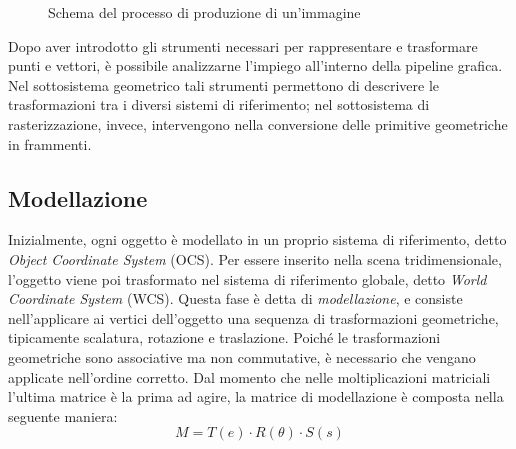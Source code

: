 \begin{figure}[ht]
    \centering
    \caption{Schema del processo di produzione di un'immagine}
    \label{fig:pipeline}
\end{figure}

Dopo aver introdotto gli strumenti necessari per rappresentare e trasformare punti e vettori, è possibile analizzarne l’impiego all’interno della pipeline grafica.
Nel sottosistema geometrico tali strumenti permettono di descrivere le trasformazioni tra i diversi sistemi di riferimento; nel sottosistema di rasterizzazione, invece, intervengono nella conversione delle primitive geometriche in frammenti.

\subsection{Modellazione}
Inizialmente, ogni oggetto è modellato in un proprio sistema di riferimento, detto \emph{Object Coordinate System} (OCS).
Per essere inserito nella scena tridimensionale, l’oggetto viene poi trasformato nel sistema di riferimento globale, detto \emph{World Coordinate System} (WCS).
Questa fase è detta di \emph{modellazione}, e consiste nell'applicare ai vertici dell'oggetto una sequenza di trasformazioni geometriche, tipicamente scalatura, rotazione e traslazione.
Poiché le trasformazioni geometriche sono associative ma non commutative, è necessario che vengano applicate nell'ordine corretto.
Dal momento che nelle moltiplicazioni matriciali l'ultima matrice è la prima ad agire, la matrice di modellazione è composta nella seguente maniera:
\[
    M = T(e) \cdot R(\theta) \cdot S(s)
\]

